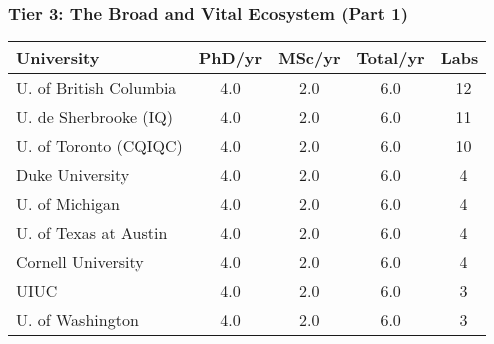 \documentclass[aspectratio=169]{beamer}
\newcommand{\tabletext}{\normalsize}
\begin{document}
\begin{frame}
    \frametitle{Tier 3: The Broad and Vital Ecosystem (Part 1)}
    \subtitle{Medium producers with 4-6 total theses per year}
    
    \begin{table}
        \centering
        \tabletext
        \begin{tabularx}{\textwidth}{
            l
            S[table-format=1.1]
            S[table-format=1.1]
            S[table-format=1.1]
            S[table-format=2.0, table-space-text-pre=~]
        }
            \toprule
            \textbf{University} & {\textbf{PhD/yr}} & {\textbf{MSc/yr}} & {\textbf{Total/yr}} & {\textbf{Labs}} \\
            \midrule
            U. of British Columbia & 4.0 & 2.0 & 6.0 & ~12 \\
            U. de Sherbrooke (IQ) & 4.0 & 2.0 & 6.0 & ~11 \\
            U. of Toronto (CQIQC) & 4.0 & 2.0 & 6.0 & ~10 \\
            Duke University & 4.0 & 2.0 & 6.0 & ~4 \\
            U. of Michigan & 4.0 & 2.0 & 6.0 & ~4 \\
            U. of Texas at Austin & 4.0 & 2.0 & 6.0 & ~4 \\
            Cornell University & 4.0 & 2.0 & 6.0 & ~4 \\
            UIUC & 4.0 & 2.0 & 6.0 & ~3 \\
            U. of Washington & 4.0 & 2.0 & 6.0 & ~3 \\
            \bottomrule
        \end{tabularx}
    \end{table}
\end{frame}
\end{document}
